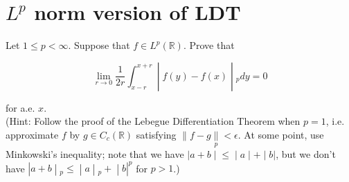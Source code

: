 \documentclass{qlnotes-export}
\begin{document}
\section{\texorpdfstring{\(L^{p}\) norm version of LDT}{L\^{}\{p\} norm version of LDT}}\label{lp-norm-version-of-ldt}

Let \(1 \leq p < \infty\). Suppose that \(f \in L^{p}({\mathbb{R}})\). Prove that

\[\left. \lim\limits_{r\rightarrow 0}\frac{1}{2r}\int_{x - r}^{x + r} \middle| f(y) - f(x) \middle| {}_{p} dy = 0 \right.\]

for a.e. \(x\).\\
(Hint: Follow the proof of the Lebegue Differentiation Theorem when \(p = 1\), i.e. approximate \(f\) by \(g \in C_{c}({\mathbb{R}})\) satisfying \(\parallel f - g\underset{p}{\parallel} < \epsilon\). At some point, use Minkowski's inequality; note that we have \(\left. |a + b \middle| \leq \middle| a \middle| + \middle| b| \right.\), but we don't have \(\left. |a + b \middle| {}_{p} \leq \middle| a \middle| {}_{p} + \middle| b|^{p} \right.\) for \(p > 1\).)
\end{document}
